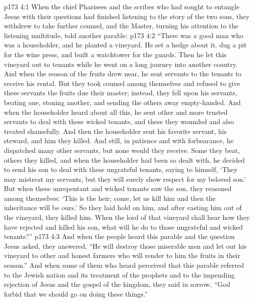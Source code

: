 \vs p173 4:1 When the chief Pharisees and the scribes who had sought to entangle Jesus with their questions had finished listening to the story of the two sons, they withdrew to take further counsel, and the Master, turning his attention to the listening multitude, told another parable:
\vs p173 4:2 \pc \textcolor{ubdarkred}{“There was a good man who was a householder, and he planted a vineyard. He set a hedge about it, dug a pit for the wine press, and built a watchtower for the guards. Then he let this vineyard out to tenants while he went on a long journey into another country. And when the season of the fruits drew near, he sent servants to the tenants to receive his rental. But they took counsel among themselves and refused to give these servants the fruits due their master; instead, they fell upon his servants, beating one, stoning another, and sending the others away empty\hyp{}handed. And when the householder heard about all this, he sent other and more trusted servants to deal with these wicked tenants, and these they wounded and also treated shamefully. And then the householder sent his favorite servant, his steward, and him they killed. And still, in patience and with forbearance, he dispatched many other servants, but none would they receive. Some they beat, others they killed, and when the householder had been so dealt with, he decided to send his son to deal with these ungrateful tenants, saying to himself, ‘They may mistreat my servants, but they will surely show respect for my beloved son.’ But when these unrepentant and wicked tenants saw the son, they reasoned among themselves: ‘This is the heir; come, let us kill him and then the inheritance will be ours.’ So they laid hold on him, and after casting him out of the vineyard, they killed him. When the lord of that vineyard shall hear how they have rejected and killed his son, what will he do to those ungrateful and wicked tenants?”}
\vs p173 4:3 \pc And when the people heard this parable and the question Jesus asked, they answered, “He will destroy those miserable men and let out his vineyard to other and honest farmers who will render to him the fruits in their season.” And when some of them who heard perceived that this parable referred to the Jewish nation and its treatment of the prophets and to the impending rejection of Jesus and the gospel of the kingdom, they said in sorrow, “God forbid that we should go on doing these things.”
